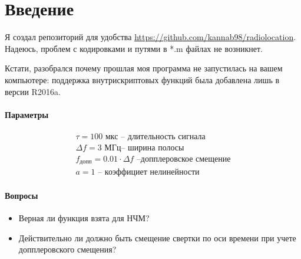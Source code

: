 \documentclass[a4paper,14pt]{extarticle}
\begin{document}
\section{Введение}%
\label{sec:voprosy}
Я создал репозиторий для удобства
\url{https://github.com/kannab98/radiolocation}.
Надеюсь, проблем с кодировками и путями в *.m файлах не возникнет. 

Кстати,
разобрался почему прошлая моя программа не запустилась на вашем компьютере:
поддержка внутрискриптовых функций была добавлена лишь в версии R2016a.

\paragraph{Параметры}%
\label{par:parametry}
\begin{gather}
    \tau = 100 \text{ мкс} \text{ -- длительность сигнала}\\
    \Delta f = 3 \text{ МГц} \text{-- ширина полосы}\\
    f_{\text{допп}} = 0.01 \cdot \Delta f \text{ --допплеровское смещение}\\
    a = 1 \text{ -- коэффициет нелинейности}
\end{gather}



\paragraph{Вопросы}%
\label{par:voprosy}
\begin{itemize}
    \item Верная ли функция взята для НЧМ?
    \item Действительно ли должно быть смещение свертки по оси времени при
        учете допплеровского смещения?
\end{itemize}
\end{document}
